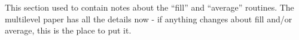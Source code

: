 This section used to contain notes about the ``fill'' and ``average'' routines.  
The multilevel paper has all the details now - if anything changes about fill 
and/or average, this is the place to put it.
